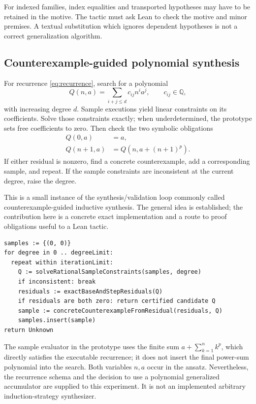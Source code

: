 \documentclass[11pt,letterpaper]{article}
\newcommand{\Q}{\mathbb{Q}}
\theoremstyle{definition}\newtheorem{definition}[proposition]{Definition}
\begin{document}
For indexed families, index equalities and transported hypotheses may have to be retained in the motive. The tactic must ask Lean to check the motive and minor premises. A textual substitution which ignores dependent hypotheses is not a correct generalization algorithm.

\subsection{Counterexample-guided polynomial synthesis}
For recurrence \eqref{eq:recurrence}, search for a polynomial
\[
Q(n,a)=\sum_{i+j\le d} c_{ij}n^i a^j,\qquad c_{ij}\in\Q,
\]
with increasing degree $d$. Sample executions yield linear constraints on its coefficients. Solve those constraints exactly; when underdetermined, the prototype sets free coefficients to zero. Then check the two symbolic obligations
\begin{align}
Q(0,a)&=a,\label{eq:base}\\
Q(n+1,a)&=Q(n,a+(n+1)^p).\label{eq:step}
\end{align}
If either residual is nonzero, find a concrete counterexample, add a corresponding sample, and repeat. If the sample constraints are inconsistent at the current degree, raise the degree.

This is a small instance of the synthesis/validation loop commonly called counterexample-guided inductive synthesis. The general idea is established; the contribution here is a concrete exact implementation and a route to proof obligations useful to a Lean tactic.~\cite{cegis}

\begin{lstlisting}
samples := {(0, 0)}
for degree in 0 .. degreeLimit:
  repeat within iterationLimit:
    Q := solveRationalSampleConstraints(samples, degree)
    if inconsistent: break
    residuals := exactBaseAndStepResiduals(Q)
    if residuals are both zero: return certified candidate Q
    sample := concreteCounterexampleFromResidual(residuals, Q)
    samples.insert(sample)
return Unknown
\end{lstlisting}

The sample evaluator in the prototype uses the finite sum $a+\sum_{k=1}^n k^p$, which directly satisfies the executable recurrence; it does not insert the final power-sum polynomial into the search. Both variables $n,a$ occur in the ansatz. Nevertheless, the recurrence schema and the decision to use a polynomial generalized accumulator are supplied to this experiment. It is not an implemented arbitrary induction-strategy synthesizer.
\end{document}
